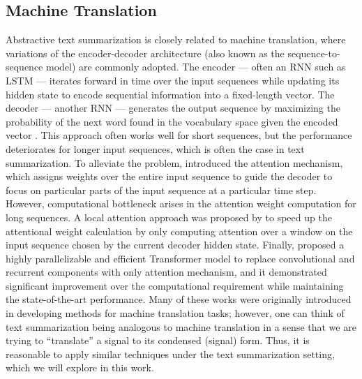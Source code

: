 \subsection{Machine Translation}
Abstractive text summarization is closely related to machine translation, where variations of the encoder-decoder architecture (also known as the sequence-to-sequence model) are commonly adopted. The encoder --- often an RNN such as LSTM --- iterates forward in time over the input sequences while updating its hidden state to encode sequential information into a fixed-length vector. The decoder --- another RNN --- generates the output sequence by maximizing the probability of the next word found in the vocabulary space given the encoded vector \cite{sutskever2014sequence,cho2014learning}. This approach often works well for short sequences, but the performance deteriorates for longer input sequences, which is often the case in text summarization. To alleviate the problem, \cite{bahdanau2014neural} introduced the attention mechanism, which assigns weights over the entire input sequence to guide the decoder to focus on particular parts of the input sequence at a particular time step. However, computational bottleneck arises in the attention weight computation for long sequences. A local attention approach was proposed by \cite{luong2015effective} to speed up the attentional weight calculation by only computing attention over a window on the input sequence chosen by the current decoder hidden state. Finally, \cite{vaswani2017attention} proposed a highly parallelizable and efficient Transformer model to replace convolutional and recurrent components with only attention mechanism, and it demonstrated significant improvement over the computational requirement while maintaining the state-of-the-art performance. Many of these works were originally introduced in developing methods for machine translation tasks; however, one can think of text summarization being analogous to machine translation in a sense that we are trying to ``translate'' a signal to its condensed (signal) form. Thus, it is reasonable to apply similar techniques under the text summarization setting, which we will explore in this work.

